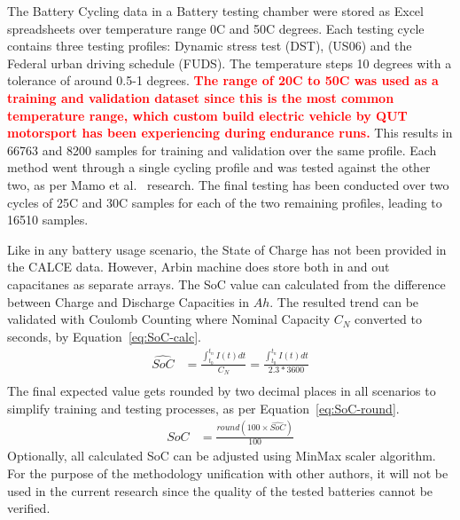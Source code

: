 %
%
The Battery Cycling data in a Battery testing chamber were stored as Excel spreadsheets over temperature range 0\textdegree{}C and 50\textdegree{}C degrees.
Each testing cycle contains three testing profiles: Dynamic stress test (DST), (US06) and the Federal urban driving schedule (FUDS).
The temperature steps 10 degrees with a tolerance of around 0.5-1 degrees.
\textcolor{red}{\textbf{The range of 20\textdegree{}C to 50\textdegree{}C was used as a training and validation dataset since this is the most common temperature range, which custom build electric vehicle by QUT motorsport has been experiencing during endurance runs.}}
This results in 66763 and 8200 samples for training and validation over the same profile.
Each method went through a single cycling profile and was tested against the other two, as per Mamo et al.~\cite{mamo_long_2020} research.
The final testing has been conducted over two cycles of 25\textdegree{}C and 30\textdegree{}C samples for each of the two remaining profiles, leading to 16510 samples.

%
Like in any battery usage scenario, the State of Charge has not been provided in the CALCE data.
However, Arbin machine does store both in and out capacitanes as separate arrays.
The SoC value can calculated from the difference between Charge and Discharge Capacities in $Ah$.
The resulted trend can be validated with Coulomb Counting where Nominal Capacity $C_{N}$ converted to seconds, by \mbox{Equation~\ref{eq:SoC-calc}}.
\begin{equation}
    \begin{split}
        \hat{SoC} &= \frac{\int_{t_0}^{t_n} I(t)dt} {C_{N}} = \frac{\int_{t_0}^{t_n} I(t)dt} {2.3*3600} \\
        \label{eq:SoC-calc}
    \end{split}
\end{equation}
The final expected value gets rounded by two decimal places in all scenarios to simplify training and testing processes, as per Equation~\ref{eq:SoC-round}. 
\begin{equation}
    \begin{split}
        SoC &= \frac{round(100\times\hat{SoC})}{100}
        \label{eq:SoC-round}
    \end{split}
\end{equation}
Optionally, all calculated SoC can be adjusted using MinMax scaler algorithm.
For the purpose of the methodology unification with other authors, it will not be used in the current research since the quality of the tested batteries cannot be verified.
